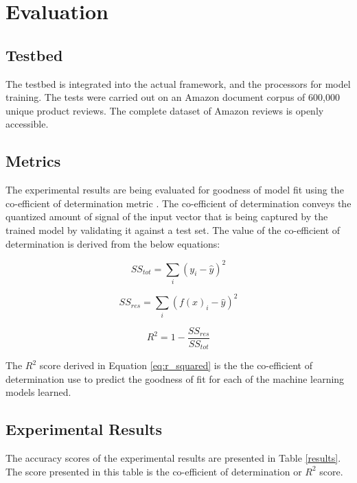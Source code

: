 \documentclass[conference]{IEEEtran}
\begin{document}
\vspace{5mm}

\section{Evaluation}

    \subsection{Testbed}
        The testbed is integrated into the actual framework, and the processors for model training.
        The tests were carried out on an Amazon document corpus of 600,000 unique product reviews.
        The complete dataset of Amazon reviews is openly accessible\cite{amazon_datasets}.

    \subsection{Metrics}
        The experimental results are being evaluated for goodness of model fit using the co-efficient of determination metric \cite{jaeger1990statistics}.
        The co-efficient of determination conveys the quantized amount of signal of the input vector that is being captured by the trained model by validating it against a test set. 
        The value of the co-efficient of determination is derived from the below equations:

        \begin{equation}
            \displaystyle SS_{tot} = \sum_{i} (y_i - \hat{y})^2
        \end{equation}

        \begin{equation}
            \displaystyle SS_{res} = \sum_{i} (f(x)_i - \hat{y})^2
        \end{equation}

        \begin{equation} \label{eq:r_squared}
            \displaystyle R^2 = 1 - \frac{SS_{res}}{SS_{tot}}
        \end{equation}

        The $R^2$ score derived in Equation \ref{eq:r_squared} is the the co-efficient of determination use to predict the goodness of fit for each of the machine learning models learned.


    \subsection{Experimental Results}
        The accuracy scores of the experimental results are presented in Table \ref{results}. The score presented in this table is the co-efficient of determination or $R^2$ score.
\end{document}
